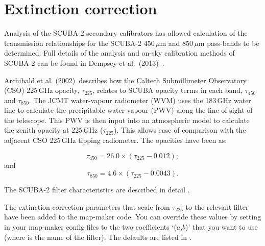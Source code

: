 \section{Extinction correction}

Analysis of the SCUBA-2 secondary calibrators has allowed calculation
of the transmission relationships for the SCUBA-2 450\,$\mu$m and
850\,$\mu$m pass-bands to be determined. Full details of the analysis
and on-sky calibration methods of SCUBA-2 can be found in Dempsey et
al.\ (2013)~\cite{dempsey12}\cite{dempsey-spie}.

Archibald et al. (2002)\,\cite{archibald} describes how the Caltech
Submillimeter Observatory (CSO) 225\,GHz opacity, $\tau_{225}$,
relates to SCUBA opacity terms in each band, $\tau_{450}$ and
$\tau_{850}$. The JCMT water-vapour radiometer (WVM) uses the 183\,GHz
water line to calculate the precipitable water vapour (PWV) along the
line-of-sight of the telescope. This PWV is then input into an
atmospheric model to calculate the zenith opacity at 225\,GHz
($\tau_{225}$). This allows ease of comparison with the adjacent CSO
225\,GHz tipping radiometer. The opacities have been as:

\begin{equation}
\tau_{450} = 26.0 \times (\tau_{225} - 0.012);
\end{equation}
and
\begin{equation}
\tau_{850} = 4.6 \times (\tau_{225} - 0.0043).
\end{equation}

The SCUBA-2 filter characteristics are described in detail
.

The extinction correction parameters that scale from $\tau_{225}$ to
the relevant filter have been added to the map-maker code. You can
override these values by setting  in
your map-maker config files to the two coefficients `($a$,$b$)' that
you want to use (where  is the name of the
filter). The defaults are listed in
.



